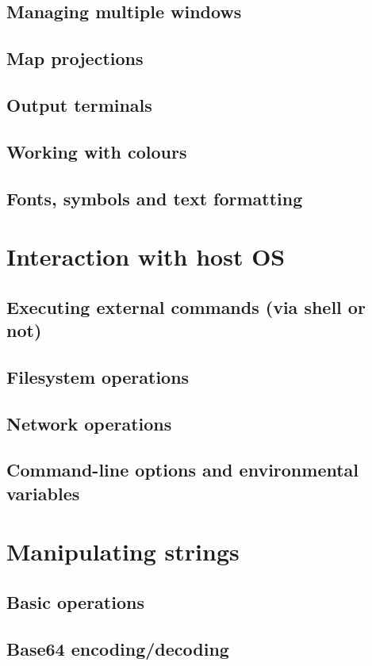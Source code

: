 \documentclass[10pt,titleauthor,openany]{mwbk}
\begin{document}
  \section{Managing multiple windows}
  \section{Map projections}
  
  \section{Output terminals}
  \section{Working with colours}
  
  \section{Fonts, symbols and text formatting}
  

  \chapter{Interaction with host OS}
  \section{Executing external commands (via shell or not)}
  \section{Filesystem operations}
  \section{Network operations}
  \section{Command-line options and environmental variables}

  \chapter{Manipulating strings}
  
  \section{Basic operations}
  \section{Base64 encoding/decoding}
\end{document}
